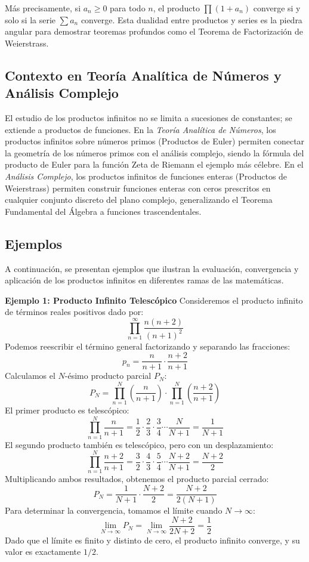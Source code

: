 \documentclass[a4paper]{article}
\begin{document}
Más precisamente, si $a_n \geq 0$ para todo $n$, el producto $\prod (1 + a_n)$ converge si y solo si la serie $\sum a_n$ converge. Esta dualidad entre productos y series es la piedra angular para demostrar teoremas profundos como el Teorema de Factorización de Weierstrass.

\subsection*{Contexto en Teoría Analítica de Números y Análisis Complejo}
El estudio de los productos infinitos no se limita a sucesiones de constantes; se extiende a productos de funciones. 
En la \textit{Teoría Analítica de Números}, los productos infinitos sobre números primos (Productos de Euler) permiten conectar la geometría de los números primos con el análisis complejo, siendo la fórmula del producto de Euler para la función Zeta de Riemann el ejemplo más célebre.
En el \textit{Análisis Complejo}, los productos infinitos de funciones enteras (Productos de Weierstrass) permiten construir funciones enteras con ceros prescritos en cualquier conjunto discreto del plano complejo, generalizando el Teorema Fundamental del Álgebra a funciones trascendentales.

\subsection{Ejemplos}

A continuación, se presentan ejemplos que ilustran la evaluación, convergencia y aplicación de los productos infinitos en diferentes ramas de las matemáticas.

\textbf{Ejemplo 1: Producto Infinito Telescópico}
Consideremos el producto infinito de términos reales positivos dado por:
$$ \prod_{n=1}^{\infty} \frac{n(n+2)}{(n+1)^2} $$
Podemos reescribir el término general factorizando y separando las fracciones:
$$ p_n = \frac{n}{n+1} \cdot \frac{n+2}{n+1} $$
Calculamos el $N$-ésimo producto parcial $P_N$:
$$ P_N = \prod_{n=1}^{N} \left( \frac{n}{n+1} \right) \cdot \prod_{n=1}^{N} \left( \frac{n+2}{n+1} \right) $$
El primer producto es telescópico:
$$ \prod_{n=1}^{N} \frac{n}{n+1} = \frac{1}{2} \cdot \frac{2}{3} \cdot \frac{3}{4} \cdots \frac{N}{N+1} = \frac{1}{N+1} $$
El segundo producto también es telescópico, pero con un desplazamiento:
$$ \prod_{n=1}^{N} \frac{n+2}{n+1} = \frac{3}{2} \cdot \frac{4}{3} \cdot \frac{5}{4} \cdots \frac{N+2}{N+1} = \frac{N+2}{2} $$
Multiplicando ambos resultados, obtenemos el producto parcial cerrado:
$$ P_N = \frac{1}{N+1} \cdot \frac{N+2}{2} = \frac{N+2}{2(N+1)} $$
Para determinar la convergencia, tomamos el límite cuando $N \to \infty$:
$$ \lim_{N \to \infty} P_N = \lim_{N \to \infty} \frac{N+2}{2N+2} = \frac{1}{2} $$
Dado que el límite es finito y distinto de cero, el producto infinito converge, y su valor es exactamente $1/2$.
\end{document}
